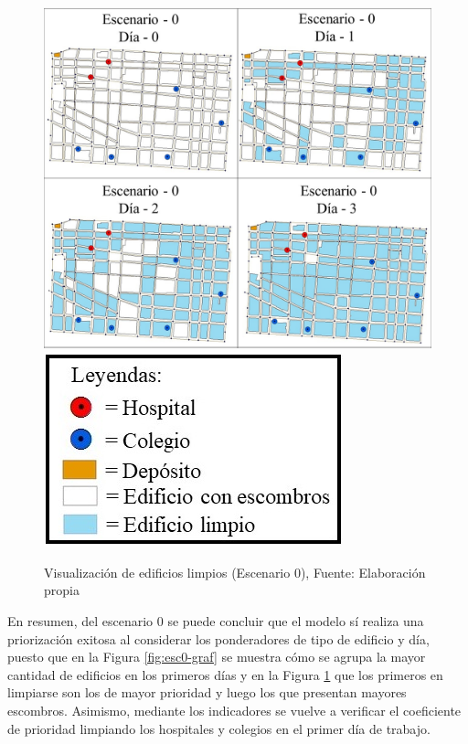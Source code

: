 \documentclass[12pt,a4paper]{article}
\begin{document}

\begin{figure}[h!]
\centering
\includegraphics[scale=0.3]{Figuras/visu1.jpg}
\includegraphics[scale=0.4]{Figuras/simb2.jpg} 
\caption{Visualización de edificios limpios  (Escenario 0), Fuente: Elaboración propia}
\label{fig:esc0-visu}
\end{figure}


En resumen, del escenario 0 se puede concluir que el modelo sí realiza una priorización exitosa al considerar los ponderadores de tipo de edificio y día, puesto que en la Figura \ref{fig:esc0-graf} se muestra cómo se agrupa la mayor cantidad de edificios en los primeros días y en la Figura \ref{fig:esc0-visu} que los primeros en limpiarse son los de mayor prioridad y luego los que presentan mayores escombros. Asimismo, mediante los indicadores se vuelve a verificar el coeficiente de prioridad limpiando los hospitales y colegios en el primer día de trabajo.
\end{document}
